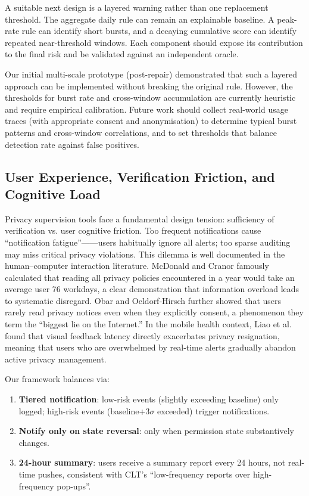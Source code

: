 A suitable next design is a layered warning rather than one replacement threshold. The aggregate daily rule can remain an explainable baseline. A peak-rate rule can identify short bursts, and a decaying cumulative score can identify repeated near-threshold windows. Each component should expose its contribution to the final risk and be validated against an independent oracle.

Our initial multi-scale prototype (post-repair) demonstrated that such a layered approach can be implemented without breaking the original rule. However, the thresholds for burst rate and cross-window accumulation are currently heuristic and require empirical calibration. Future work should collect real-world usage traces (with appropriate consent and anonymisation) to determine typical burst patterns and cross-window correlations, and to set thresholds that balance detection rate against false positives.

\subsection{User Experience, Verification Friction, and Cognitive Load}

Privacy supervision tools face a fundamental design tension: sufficiency of verification vs. user cognitive friction. Too frequent notifications cause ``notification fatigue''——users habitually ignore all alerts; too sparse auditing may miss critical privacy violations. This dilemma is well documented in the human–computer interaction literature. McDonald and Cranor \cite{12} famously calculated that reading all privacy policies encountered in a year would take an average user 76 workdays, a clear demonstration that information overload leads to systematic disregard. Obar and Oeldorf‐Hirsch \cite{13} further showed that users rarely read privacy notices even when they explicitly consent, a phenomenon they term the ``biggest lie on the Internet.'' In the mobile health context, Liao et al. \cite{14} found that visual feedback latency directly exacerbates privacy resignation, meaning that users who are overwhelmed by real‑time alerts gradually abandon active privacy management.

Our framework balances via:
\begin{enumerate}
\item \textbf{Tiered notification}: low-risk events (slightly exceeding baseline) only logged; high-risk events (baseline+3$\sigma$ exceeded) trigger notifications.
\item \textbf{Notify only on state reversal}: only when permission state substantively changes.
\item \textbf{24-hour summary}: users receive a summary report every 24 hours, not real-time pushes, consistent with CLT's ``low-frequency reports over high-frequency pop-ups''.
\end{enumerate}

